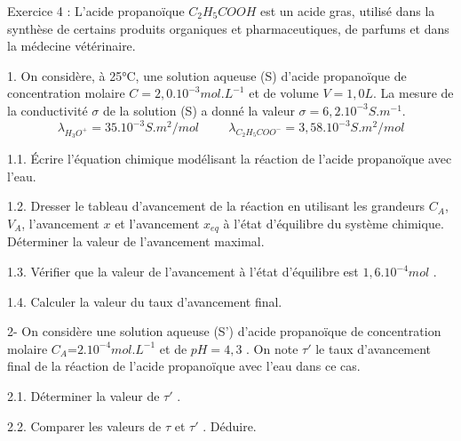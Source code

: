\documentclass[12pt, french]{article}
\begin{document}
\begin{Box2}{Exercice 4 : }
L'acide propanoïque $C_2H_5COOH$ est un acide gras, utilisé dans la synthèse de certains produits organiques et
pharmaceutiques, de parfums et dans la médecine vétérinaire.

1. On considère, à 25°C, une solution aqueuse (S) d’acide propanoïque de concentration molaire $C =2,0.10^{-3}mol.L^{-1}$ et de volume $V =1,0 L$. La mesure de la conductivité $\sigma$ de la solution (S) a donné la valeur $\sigma = 6,2.10^{-3} S.m^{-1}$.
$$\lambda_{H_3O^+} = 35.10^{-3}S.m^2/mol \hspace{1cm} \lambda_{C_2H_5COO^-}=3,58.10^{-3}S.m^2/mol$$

1.1. Écrire l’équation chimique modélisant la réaction de l’acide propanoïque avec l’eau.

1.2. Dresser le tableau d’avancement de la réaction en utilisant les grandeurs $C_A$, $V_A$, l'avancement $x$ et l'avancement $x_{eq}$ à l'état d’équilibre du système chimique. Déterminer la valeur de l'avancement maximal.

1.3. Vérifier que la valeur de l'avancement à l'état d’équilibre est $1, 6.10^{-4} mol$ .

1.4. Calculer la valeur du taux d'avancement final.

2- On considère une solution aqueuse (S') d'acide propanoïque de concentration molaire $C_A$=$2.10^{-4} mol.L^{-1}$ et de
$pH = 4, 3$ . On note $\tau'$ le taux d'avancement final de la réaction de l'acide propanoïque avec l'eau dans ce cas.

2.1. Déterminer la valeur de $\tau'$ .

2.2. Comparer les valeurs de $\tau$ et $\tau'$ . Déduire.


\end{Box2}


\begin{center}

\end{center}
\end{document}
